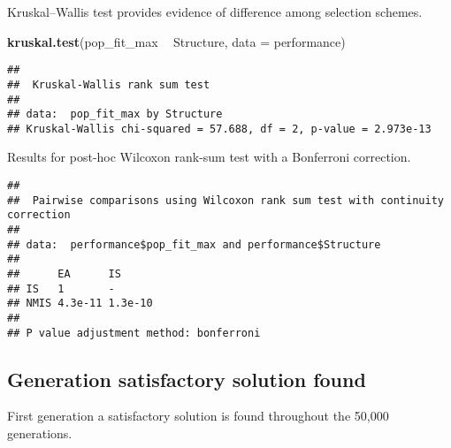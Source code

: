 \documentclass[]{book}
\newenvironment{Shaded}{\begin{snugshade}}{\end{snugshade}}
\newcommand{\DataTypeTok}[1]{\textcolor[rgb]{0.13,0.29,0.53}{#1}}
\newcommand{\KeywordTok}[1]{\textcolor[rgb]{0.13,0.29,0.53}{\textbf{#1}}}
\newcommand{\NormalTok}[1]{#1}
\newcommand{\OperatorTok}[1]{\textcolor[rgb]{0.81,0.36,0.00}{\textbf{#1}}}
\newcommand{\OtherTok}[1]{\textcolor[rgb]{0.56,0.35,0.01}{#1}}
\newcommand{\StringTok}[1]{\textcolor[rgb]{0.31,0.60,0.02}{#1}}
\begin{document}
Kruskal--Wallis test provides evidence of difference among selection schemes.

\begin{Shaded}
\begin{Highlighting}[]
\KeywordTok{kruskal.test}\NormalTok{(pop_fit_max }\OperatorTok{~}\StringTok{ }\NormalTok{Structure, }\DataTypeTok{data =}\NormalTok{ performance)}
\end{Highlighting}
\end{Shaded}

\begin{verbatim}
## 
##  Kruskal-Wallis rank sum test
## 
## data:  pop_fit_max by Structure
## Kruskal-Wallis chi-squared = 57.688, df = 2, p-value = 2.973e-13
\end{verbatim}

Results for post-hoc Wilcoxon rank-sum test with a Bonferroni correction.

\begin{Shaded}
\end{Shaded}

\begin{verbatim}
## 
##  Pairwise comparisons using Wilcoxon rank sum test with continuity correction 
## 
## data:  performance$pop_fit_max and performance$Structure 
## 
##      EA      IS     
## IS   1       -      
## NMIS 4.3e-11 1.3e-10
## 
## P value adjustment method: bonferroni
\end{verbatim}

\hypertarget{generation-satisfactory-solution-found-6}{%
\subsection{Generation satisfactory solution found}\label{generation-satisfactory-solution-found-6}}

First generation a satisfactory solution is found throughout the 50,000 generations.
\end{document}
